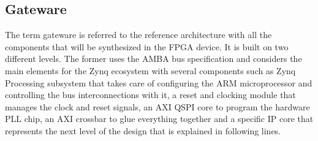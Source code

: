 \documentclass[review]{elsarticle}
\begin{document}

\subsection{Gateware}

%
%

The term gateware is referred to the reference architecture with all the components that will be synthesized in the FPGA device. It is built on two different levels. The former uses the AMBA bus specification and considers the main elements for the Zynq ecosystem with several components such as Zynq Processing subsystem that takes care of configuring the ARM microprocessor and controlling the bus interconnections with it, a reset and clocking module that manages the clock and reset signals, an AXI QSPI core to program the hardware PLL chip, an AXI crossbar to glue everything together and a specific IP core that represents the next level of the design that is explained in following lines.
\end{document}
